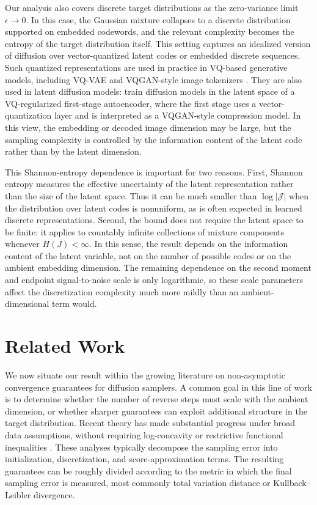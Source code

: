 \documentclass[11pt]{article}
\begin{document}
Our analysis also covers discrete target distributions as the zero-variance
limit $\epsilon\to0$. In this case, the Gaussian mixture collapses to a
discrete distribution supported on embedded codewords, and the relevant
complexity becomes the entropy of the target distribution itself. This setting
captures an idealized version of diffusion over vector-quantized latent codes
or embedded discrete sequences. Such quantized representations are used in
practice in VQ-based generative models, including VQ-VAE and VQGAN-style image
tokenizers \cite{van2017neural,esser2021taming}. They are also used in latent
diffusion models: \cite{rombach2022high} train diffusion models in the latent
space of a VQ-regularized first-stage autoencoder, where the first stage uses a
vector-quantization layer and is interpreted as a VQGAN-style compression
model. In this view, the embedding or decoded image dimension may be large,
but the sampling complexity is controlled by the information content of the
latent code rather than by the latent dimension.

This Shannon-entropy dependence is important for two reasons. First, Shannon
entropy measures the effective uncertainty of the latent representation rather
than the size of the latent space. Thus it can be much smaller than
$\log |\mathcal J|$ when the distribution over latent codes is nonuniform,
as is often expected in learned discrete representations. Second, the bound
does not require the latent space to be finite: it applies to countably
infinite collections of mixture components whenever $H(J)<\infty$. In this
sense, the result depends on the information content of the latent variable,
not on the number of possible codes or on the ambient embedding dimension.
The remaining dependence on the second moment and endpoint signal-to-noise
scale is only logarithmic, so these scale parameters affect the discretization
complexity much more mildly than an ambient-dimensional term would.
\section{Related Work}

We now situate our result within the growing literature on non-asymptotic
convergence guarantees for diffusion samplers. A common goal in this line of
work is to determine whether the number of reverse steps must scale with the
ambient dimension, or whether sharper guarantees can exploit additional
structure in the target distribution. Recent theory has made substantial progress under broad data
assumptions, without requiring log-concavity or restrictive functional
inequalities
\cite{chen2023sampling,chen2023improved,benton2024nearly,li2025odt}.
These analyses typically decompose the sampling error into initialization,
discretization, and score-approximation terms. The resulting guarantees can be
roughly divided according to the metric in which the final sampling error is
measured, most commonly total variation distance or Kullback--Leibler
divergence.
\end{document}

